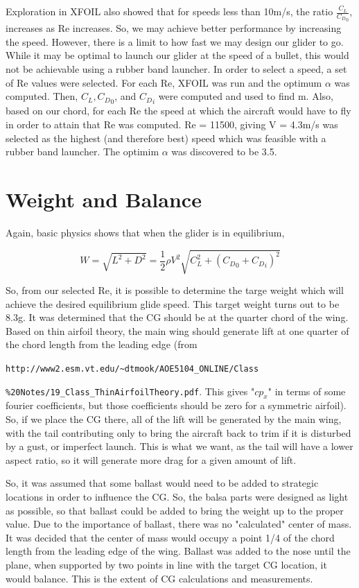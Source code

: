 \documentclass{article}
\begin{document}
Exploration in XFOIL also showed that for speeds less than 10m/s, the ratio $\frac{C_L}{{C_D}_0}$, increases as Re increases. So, we may achieve
better performance by increasing the speed. However, there is a limit to how fast we may design our glider to go. While it may be optimal to
launch our glider at the speed of a bullet, this would not be achievable using a rubber band launcher. In order to select a speed, a set of
Re values were selected. For each Re, XFOIL was run and the optimum $\alpha$ was computed. Then, $C_L, {C_D}_0$, and ${C_D}_i$ were computed
and used to find m. Also, based on our chord, for each Re the speed at which the aircraft would have to fly in order to attain that Re was
computed. Re = 11500, giving V = 4.3m/s was selected as the highest (and therefore best) speed which was feasible with a rubber band launcher. The
optimim $\alpha$ was discovered to be 3.5\degree.

\section{Weight and Balance}

Again, basic physics shows that when the glider is in equilibrium,

\[W = \sqrt{L^2 + D^2}
= \frac{1}{2}\rho V^2 \sqrt{C_L^2 + ({C_D}_0 + {C_D}_i)^2}\]

So, from our selected Re, it is possible to determine the targe weight which will achieve the desired equilibrium glide speed. This target weight
turns out to be 8.3g. It was determined that the CG should be at the quarter chord of the wing. Based on thin airfoil theory, the main wing should
generate lift at one quarter of the chord length from the leading edge (from

\verb|http://www2.esm.vt.edu/~dtmook/AOE5104_ONLINE/Class|

\verb|%20Notes/19_Class_ThinAirfoilTheory.pdf|. This gives "$cp_x$" in terms of some fourier coefficients, but those coefficients should be zero for a symmetric airfoil). So, if
we place the CG there, all of the lift will be generated by the main wing, with the tail contributing only to bring the aircraft back to trim if it
is disturbed by a gust, or imperfect launch. This is what we want, as the tail will have a lower aspect ratio, so it will generate more drag for
a given amount of lift.

So, it was
assumed that some ballast would need to be added to strategic locations in order to influence the CG. So, the balsa parts were designed as light
as possible, so that ballast could be added to bring the weight up to the proper value. Due to the importance of ballast, there was no "calculated"
center of mass. It was decided that the center of mass would occupy a point 1/4 of the chord length from the leading edge of the wing. Ballast was
added to the nose until the plane, when supported by two points in line with the target CG location, it would balance. This is the extent of CG
calculations and measurements.
\end{document}
